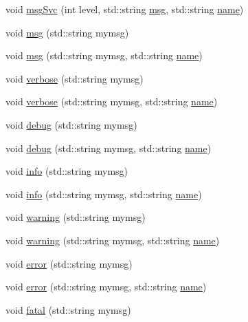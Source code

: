 \begin{DoxyCompactItemize}
\item 
void \hyperlink{classObject_a3f9d5537ebce0c0f2bf6ae4d92426f3c}{msg\+Svc} (int level, std\+::string \hyperlink{classObject_a58b2d0618c2d08cf2383012611528d97}{msg}, std\+::string \hyperlink{classObject_a300f4c05dd468c7bb8b3c968868443c1}{name})
\item 
void \hyperlink{classObject_a58b2d0618c2d08cf2383012611528d97}{msg} (std\+::string mymsg)
\item 
void \hyperlink{classObject_ac5d59299273cee27aacf7de00d2e7034}{msg} (std\+::string mymsg, std\+::string \hyperlink{classObject_a300f4c05dd468c7bb8b3c968868443c1}{name})
\item 
void \hyperlink{classObject_a83d2db2df682907ea1115ad721c1c4a1}{verbose} (std\+::string mymsg)
\item 
void \hyperlink{classObject_a2d4120195317e2a3c6532e8bb9f3da68}{verbose} (std\+::string mymsg, std\+::string \hyperlink{classObject_a300f4c05dd468c7bb8b3c968868443c1}{name})
\item 
void \hyperlink{classObject_aac010553f022165573714b7014a15f0d}{debug} (std\+::string mymsg)
\item 
void \hyperlink{classObject_a6c9a0397ca804e04d675ed05683f5420}{debug} (std\+::string mymsg, std\+::string \hyperlink{classObject_a300f4c05dd468c7bb8b3c968868443c1}{name})
\item 
void \hyperlink{classObject_a644fd329ea4cb85f54fa6846484b84a8}{info} (std\+::string mymsg)
\item 
void \hyperlink{classObject_a1ca123253dfd30fc28b156f521dcbdae}{info} (std\+::string mymsg, std\+::string \hyperlink{classObject_a300f4c05dd468c7bb8b3c968868443c1}{name})
\item 
void \hyperlink{classObject_a65cd4fda577711660821fd2cd5a3b4c9}{warning} (std\+::string mymsg)
\item 
void \hyperlink{classObject_a11f101db4dd73d9391b0231818881d86}{warning} (std\+::string mymsg, std\+::string \hyperlink{classObject_a300f4c05dd468c7bb8b3c968868443c1}{name})
\item 
void \hyperlink{classObject_a204a95f57818c0f811933917a30eff45}{error} (std\+::string mymsg)
\item 
void \hyperlink{classObject_ad7f6c457733082efa2f9ff5f5c8e119a}{error} (std\+::string mymsg, std\+::string \hyperlink{classObject_a300f4c05dd468c7bb8b3c968868443c1}{name})
\item 
void \hyperlink{classObject_aad5a16aac7516ce65bd5ec02ab07fc80}{fatal} (std\+::string mymsg)
\item 

\end{DoxyCompactItemize}
